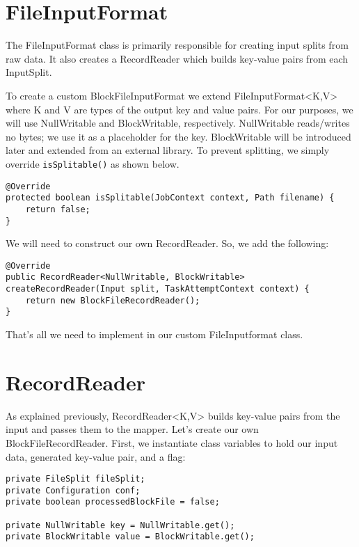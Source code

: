 \documentclass[9pt,twocolumn,twoside]{idsi}
\begin{document}
\section{FileInputFormat}

The FileInputFormat class is primarily responsible for creating input splits from raw data. It also creates a RecordReader which builds key-value pairs from each InputSplit.

To create a custom BlockFileInputFormat we extend FileInputFormat<K,V> where K and V are types of the output key and value pairs. For our purposes, we will use NullWritable and BlockWritable, respectively. NullWritable reads/writes no bytes; we use it as a placeholder for the key. BlockWritable will be introduced later and extended from an external library. To prevent splitting, we simply override \lstinline{isSplitable()} as shown below.

\lstset{language=Java}
\begin{lstlisting}
@Override
protected boolean isSplitable(JobContext context, Path filename) {
    return false;
}
\end{lstlisting}

We will need to construct our own RecordReader. So, we add the following:

\begin{lstlisting}
@Override
public RecordReader<NullWritable, BlockWritable> createRecordReader(Input split, TaskAttemptContext context) {
    return new BlockFileRecordReader();
}
\end{lstlisting}

That's all we need to implement in our custom FileInputformat class.

\section{RecordReader}

As explained previously, RecordReader<K,V> builds key-value pairs from the input and passes them to the mapper. Let's create our own BlockFileRecordReader. First, we instantiate class variables to hold our input data, generated key-value pair, and a flag:

\begin{lstlisting}
private FileSplit fileSplit;
private Configuration conf;
private boolean processedBlockFile = false;

private NullWritable key = NullWritable.get();
private BlockWritable value = BlockWritable.get();
\end{lstlisting}
\end{document}
